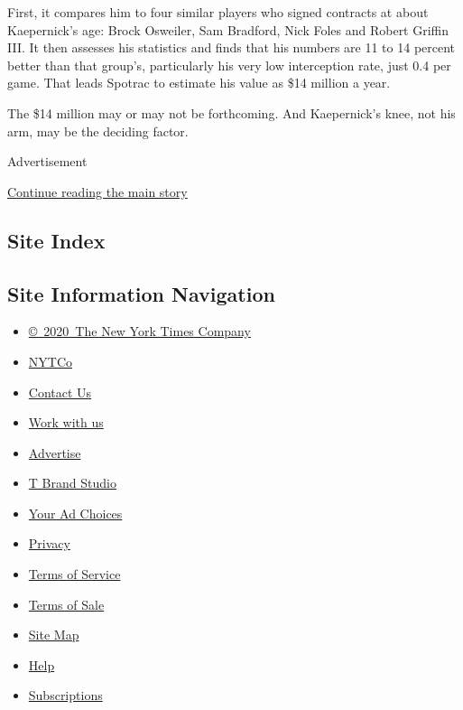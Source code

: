 First, it compares him to four similar players who signed contracts at
about Kaepernick's age: Brock Osweiler, Sam Bradford, Nick Foles and
Robert Griffin III. It then assesses his statistics and finds that his
numbers are 11 to 14 percent better than that group's, particularly his
very low interception rate, just 0.4 per game. That leads Spotrac to
estimate his value as \$14 million a year.

The \$14 million may or may not be forthcoming. And Kaepernick's knee,
not his arm, may be the deciding factor.

Advertisement

\protect\hyperlink{after-bottom}{Continue reading the main story}

\hypertarget{site-index}{%
\subsection{Site Index}\label{site-index}}

\hypertarget{site-information-navigation}{%
\subsection{Site Information
Navigation}\label{site-information-navigation}}

\begin{itemize}
\tightlist
\item
  \href{https://help.nytimes.com/hc/en-us/articles/115014792127-Copyright-notice}{©~2020~The
  New York Times Company}
\end{itemize}

\begin{itemize}
\tightlist
\item
  \href{https://www.nytco.com/}{NYTCo}
\item
  \href{https://help.nytimes.com/hc/en-us/articles/115015385887-Contact-Us}{Contact
  Us}
\item
  \href{https://www.nytco.com/careers/}{Work with us}
\item
  \href{https://nytmediakit.com/}{Advertise}
\item
  \href{http://www.tbrandstudio.com/}{T Brand Studio}
\item
  \href{https://www.nytimes.com/privacy/cookie-policy\#how-do-i-manage-trackers}{Your
  Ad Choices}
\item
  \href{https://www.nytimes.com/privacy}{Privacy}
\item
  \href{https://help.nytimes.com/hc/en-us/articles/115014893428-Terms-of-service}{Terms
  of Service}
\item
  \href{https://help.nytimes.com/hc/en-us/articles/115014893968-Terms-of-sale}{Terms
  of Sale}
\item
  \href{https://spiderbites.nytimes.com}{Site Map}
\item
  \href{https://help.nytimes.com/hc/en-us}{Help}
\item
  \href{https://www.nytimes.com/subscription?campaignId=37WXW}{Subscriptions}
\end{itemize}
